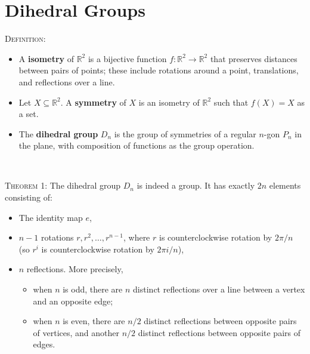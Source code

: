 \documentclass[12pt]{amsart}
\newcommand{\showsol}[1]{\def\displaysol{#1}}
\begin{document}
\showsol{0}
	
	\thispagestyle{empty}
	
	\section*{Dihedral Groups}
	
	

\begin{framed}
\textsc{Definition:}
\begin{itemize}
\item A \textbf{isometry} of $\mathbb{R}^2$ is a bijective function $f:\mathbb{R}^2 \to \mathbb{R}^2$ that preserves distances between pairs of points; these include rotations around a point, translations, and reflections over a line.

\item Let $X\subseteq \mathbb{R}^2$. A \textbf{symmetry} of $X$ is an isometry of $\mathbb{R}^2$ such that $f(X)=X$ as a set.

\item The \textbf{dihedral group} $D_n$ is the group of symmetries of a regular $n$-gon $P_n$ in the plane, with composition of functions as the group operation.
\end{itemize}


\


\textsc{Theorem 1:} The dihedral group $D_n$ is indeed a group. It has exactly $2n$ elements consisting of:
\begin{itemize} 
\item The identity map $e$,
\item $n-1$ rotations $r, r^2, \dots, r^{n-1}$, where $r$ is counterclockwise rotation by $2\pi/n$ (so $r^i$ is counterclockwise rotation by $2\pi i/n$),
\item $n$ reflections. More precisely, 
\begin{itemize} 
\item when $n$ is odd, there are $n$ distinct reflections over a line between a vertex and an opposite edge;
\item when $n$ is even, there are $n/2$ distinct reflections between opposite pairs of vertices, and another $n/2$ distinct reflections between opposite pairs of edges.
\end{itemize}
\end{itemize}

\begin{center}
\begin{minipage}{0.4\textwidth}
\begin{center}


\end{center}
\end{minipage}
\end{center}
\end{framed}
\end{document}
